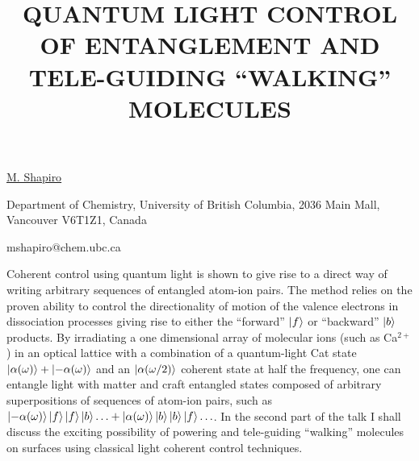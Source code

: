 \title{QUANTUM LIGHT CONTROL OF ENTANGLEMENT AND TELE-GUIDING ``WALKING'' MOLECULES}

\underline{M. Shapiro} 

{\normalsize{\vspace{-4mm}
Department of Chemistry, University of British Columbia, 2036 Main Mall,
Vancouver V6T1Z1, Canada

\email mshapiro@chem.ubc.ca}}

Coherent control using quantum light is shown to give rise to a direct way
of writing arbitrary sequences of entangled atom-ion pairs. The method
relies on the proven ability to control the directionality of motion of
the valence electrons in dissociation processes giving rise to either the
``forward'' $\left|f\right\rangle$ or ``backward'' $\left|b\right\rangle$ products. By irradiating a one dimensional
array of molecular ions (such as Ca$^{2+}$) in an optical lattice with a
combination of a quantum-light Cat state $\left|\alpha(\omega)\right\rangle+\left|-\alpha(\omega)\right\rangle$
and an $\left|\alpha(\omega/2)\right\rangle$ coherent state at half the frequency, one can
entangle light with matter and craft entangled states composed of
arbitrary superpositions of sequences of atom-ion pairs, such as
$\left|-\alpha(\omega)\right\rangle\left|f\right\rangle\left|f\right\rangle\left|b\right\rangle\ldots+\left|\alpha(\omega)\right\rangle\left|b\right\rangle\left|b\right\rangle\left|f\right\rangle\ldots$.
In the second part of the talk I shall discuss the exciting possibility
of powering and tele-guiding ``walking'' molecules on surfaces using
classical light coherent control techniques.

\vspace{\baselineskip}
